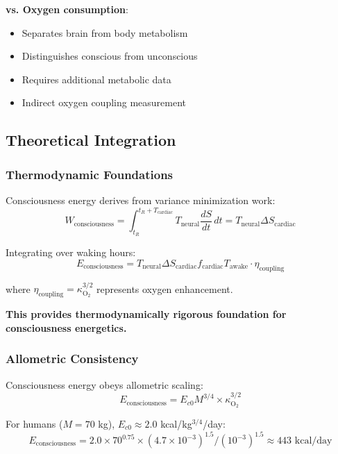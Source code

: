 \documentclass[12pt,twocolumn]{article}
\theoremstyle{remark}
\begin{document}
\textbf{vs. Oxygen consumption}:
\begin{itemize}
\item [\checkmark] Separates brain from body metabolism
\item [\checkmark] Distinguishes conscious from unconscious
\item [×] Requires additional metabolic data
\item [×] Indirect oxygen coupling measurement
\end{itemize}

\subsection{Theoretical Integration}

\subsubsection{Thermodynamic Foundations}

Consciousness energy derives from variance minimization work:
\begin{equation}
W_{\text{consciousness}} = \int_{t_R}^{t_R + T_{\text{cardiac}}} T_{\text{neural}} \frac{dS}{dt} \, dt = T_{\text{neural}} \Delta S_{\text{cardiac}}
\end{equation}

Integrating over waking hours:
\begin{equation}
E_{\text{consciousness}} = T_{\text{neural}} \Delta S_{\text{cardiac}} f_{\text{cardiac}} T_{\text{awake}} \cdot \eta_{\text{coupling}}
\end{equation}

where $\eta_{\text{coupling}} = \kappa_{\text{O}_2}^{3/2}$ represents oxygen enhancement.

\textbf{This provides thermodynamically rigorous foundation for consciousness energetics.}

\subsubsection{Allometric Consistency}

Consciousness energy obeys allometric scaling:
\begin{equation}
E_{\text{consciousness}} = E_{c0} M^{3/4} \times \kappa_{\text{O}_2}^{3/2}
\end{equation}

For humans ($M = 70$ kg), $E_{c0} \approx 2.0$ kcal/kg$^{3/4}$/day:
\begin{equation}
E_{\text{consciousness}} = 2.0 \times 70^{0.75} \times (4.7 \times 10^{-3})^{1.5} / (10^{-3})^{1.5} \approx 443 \text{ kcal/day}
\end{equation}
\end{document}
